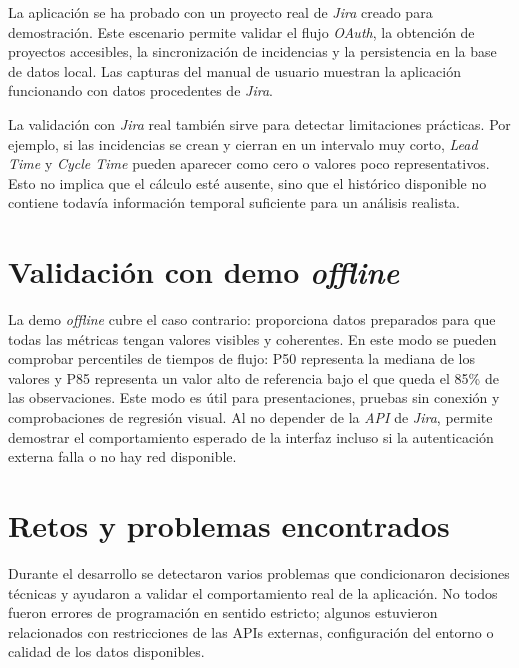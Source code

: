 La aplicación se ha probado con un proyecto real de \textit{Jira} creado para demostración. Este escenario permite validar el flujo \textit{OAuth}, la obtención de proyectos accesibles, la sincronización de incidencias y la persistencia en la base de datos local. Las capturas del manual de usuario muestran la aplicación funcionando con datos procedentes de \textit{Jira}.

La validación con \textit{Jira} real también sirve para detectar limitaciones prácticas. Por ejemplo, si las incidencias se crean y cierran en un intervalo muy corto, \textit{Lead Time} y \textit{Cycle Time} pueden aparecer como cero o valores poco representativos. Esto no implica que el cálculo esté ausente, sino que el histórico disponible no contiene todavía información temporal suficiente para un análisis realista.

\section{Validación con demo \textit{offline}}

La demo \textit{offline} cubre el caso contrario: proporciona datos preparados para que todas las métricas tengan valores visibles y coherentes. En este modo se pueden comprobar percentiles de tiempos de flujo: P50 representa la mediana de los valores y P85 representa un valor alto de referencia bajo el que queda el 85\% de las observaciones. Este modo es útil para presentaciones, pruebas sin conexión y comprobaciones de regresión visual. Al no depender de la \textit{API} de \textit{Jira}, permite demostrar el comportamiento esperado de la interfaz incluso si la autenticación externa falla o no hay red disponible.


\section{Retos y problemas encontrados}

Durante el desarrollo se detectaron varios problemas que condicionaron decisiones técnicas y ayudaron a validar el comportamiento real de la aplicación. No todos fueron errores de programación en sentido estricto; algunos estuvieron relacionados con restricciones de las APIs externas, configuración del entorno o calidad de los datos disponibles.

